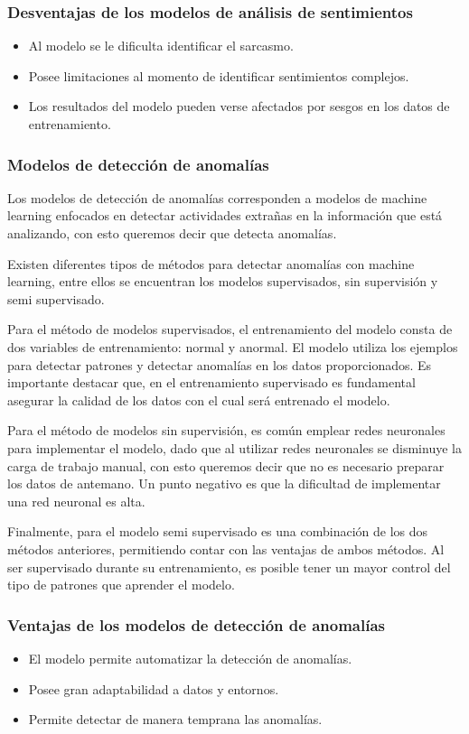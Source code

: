 \subsubsection{Desventajas de los modelos de análisis de sentimientos}
\begin{itemize}
    \item Al modelo se le dificulta identificar el sarcasmo.
    \item Posee limitaciones al momento de identificar sentimientos complejos.
    \item Los resultados del modelo pueden verse afectados por sesgos en los datos de entrenamiento.
\end{itemize}

\subsubsection{Modelos de detección de anomalías}
Los modelos de detección de anomalías corresponden a modelos de machine learning enfocados en detectar actividades extrañas en la información que está analizando, con esto queremos decir que detecta anomalías.

Existen diferentes tipos de métodos para detectar anomalías con machine learning, entre ellos se encuentran los modelos supervisados, sin supervisión y semi supervisado.

Para el método de modelos supervisados, el entrenamiento del modelo consta de dos variables de entrenamiento: normal y anormal. El modelo utiliza los ejemplos para detectar patrones y detectar anomalías en los datos proporcionados. Es importante destacar que, en el entrenamiento supervisado es fundamental asegurar la calidad de los datos con el cual será entrenado el modelo.

Para el método de modelos sin supervisión, es común emplear redes neuronales para implementar el modelo, dado que al utilizar redes neuronales se disminuye la carga de trabajo manual, con esto queremos decir que no es necesario preparar los datos de antemano. Un punto negativo es que la dificultad de implementar una red neuronal es alta.

Finalmente, para el modelo semi supervisado es una combinación de los dos métodos anteriores, permitiendo contar con las ventajas de ambos métodos. Al ser supervisado durante su entrenamiento, es posible tener un mayor control del tipo de patrones que aprender el modelo.

\subsubsection{Ventajas de los modelos de detección de anomalías}
\begin{itemize}
    \item El modelo permite automatizar la detección de anomalías.
    \item Posee gran adaptabilidad a datos y entornos.
    \item Permite detectar de manera temprana las anomalías.
\end{itemize}

